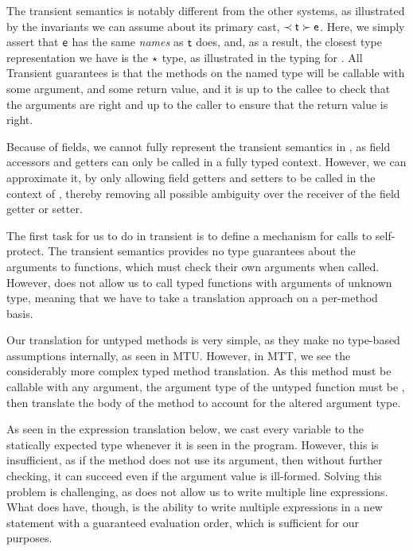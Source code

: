 \documentclass[a4paper,USenglish]{tex/lipics-v2016}
\begin{document}
The transient semantics is notably different from the other systems, as illustrated by the invariants we can assume about its primary cast, $\ShaCast\t\e$. Here, we simply assert that $\e$ has the same \emph{names} as $\t$ does, and, as a result, the closest type representation we have is the $\any$ type, as illustrated in the typing for \kafka. All Transient guarantees is that the methods on the named type will be callable with some argument, and some return value, and it is up to the callee to check that the arguments are right and up to the caller to ensure that the return value is right.

Because of fields, we cannot fully represent the transient semantics in \kafka, as field accessors and getters can only be called in a fully typed context. However, we can approximate it, by only allowing field getters and setters to be called in the context of \this, thereby removing all possible ambiguity over the receiver of the field getter or setter.


\begin{mathpar}

\end{mathpar}

The first task for us to do in transient is to define a mechanism for calls to self-protect. The transient semantics provides no type guarantees about the arguments to functions, which must check their own arguments when called. However, \kafka does not allow us to call typed functions with arguments of unknown type, meaning that we have to take a translation approach on a per-method basis.

Our translation for untyped methods is very simple, as they make no type-based assumptions internally, as seen in MTU. However, in MTT, we see the considerably more complex typed method translation. As this method must be callable with any argument, the argument type of the untyped function must be \any, then translate the body of the method to account for the altered argument type.

As seen in the expression translation below, we cast every variable to the statically expected type whenever it is seen in the program. However, this is insufficient, as if the method does not use its argument, then without further checking, it can succeed even if the argument value is ill-formed. Solving this problem is challenging, as \kafka does not allow us to write multiple line expressions. What \kafka does have, though, is the ability to write multiple expressions in a new statement with a guaranteed evaluation order, which is sufficient for our purposes. 
\end{document}
